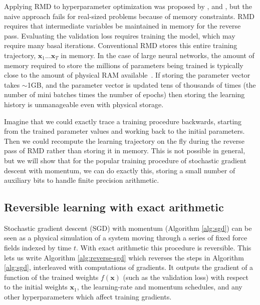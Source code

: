 \documentclass{article}
\newcommand{\vx}{\mathbf{x}}
\newcommand{\primal}{basal}
\newcommand{\params}{\vx}
\begin{document}
Applying RMD to hyperparameter optimization was proposed by \citet{bengio2000gradient}, and \citet{Autodiff14}, but the naive approach fails for real-sized problems because
of memory constraints. RMD requires that intermediate variables be maintained
in memory for the reverse pass. Evaluating the validation loss
requires training the model, which may require many \primal{} iterations. Conventional
RMD stores this entire training trajectory, $\params_1
... \params_T$ in memory.  In the case of large neural networks, the amount of
memory required to store the millions of parameters being trained is typically
close to the amount of physical RAM available~\cite{sequence2014}. If storing
the parameter vector takes $\sim$1GB, and the parameter vector is updated tens
of thousands of times (the number of mini batches times the number of
epochs) then storing the learning history is unmanageable even with
physical storage.

Imagine that we could exactly trace a training
procedure backwards, starting from the trained parameter values and working
back to the initial parameters. Then we could recompute the learning trajectory
on the fly during the reverse pass of RMD rather than storing it in memory. This is
not possible in general, but we will show that for the popular training
procedure of stochastic gradient descent with momentum, we can do
exactly this, storing a small number of auxiliary bits to handle
finite precision arithmetic.

\subsection{Reversible learning with exact arithmetic}
\label{sec:reversible learning}

Stochastic gradient descent (SGD) with momentum (Algorithm \ref{alg:sgd}) can be
seen as a physical simulation of a system moving through a series of fixed force
fields indexed by time $t$. With exact arithmetic this procedure is reversible. This lets us write Algorithm \ref{alg:reverse-sgd} which reverses the steps in Algorithm
\ref{alg:sgd}, interleaved with computations of gradients. It outputs the
gradient of a function of the trained weights $f(\vx)$ (such as the validation
loss) with respect to the initial weights $\vx_1$, the learning-rate and momentum
schedules, and any other hyperparameters which affect training gradients.
\end{document}
